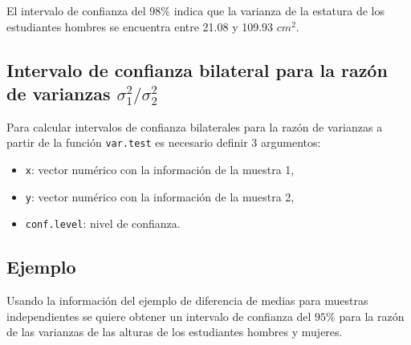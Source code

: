 \documentclass[
]{book}
\makeatletter
\newenvironment{Shaded}{\begin{snugshade}}{\end{snugshade}}
\newcommand{\AttributeTok}[1]{\textcolor[rgb]{0.77,0.63,0.00}{#1}}
\newcommand{\FloatTok}[1]{\textcolor[rgb]{0.00,0.00,0.81}{#1}}
\newcommand{\FunctionTok}[1]{\textcolor[rgb]{0.00,0.00,0.00}{#1}}
\newcommand{\NormalTok}[1]{#1}
\newcommand{\SpecialCharTok}[1]{\textcolor[rgb]{0.00,0.00,0.00}{#1}}
\providecommand{\tightlist}{%
  \setlength{\itemsep}{0pt}\setlength{\parskip}{0pt}}
\newenvironment{kframe}{%
\medskip{}
\setlength{\fboxsep}{.8em}
 \def\at@end@of@kframe{}%
 \ifinner\ifhmode%
  \def\at@end@of@kframe{\end{minipage}}%
  \begin{minipage}{\columnwidth}%
 \fi\fi%
 \def\FrameCommand##1{\hskip\@totalleftmargin \hskip-\fboxsep
 \colorbox{shadecolor}{##1}\hskip-\fboxsep
     \hskip-\linewidth \hskip-\@totalleftmargin \hskip\columnwidth}%
 \MakeFramed {\advance\hsize-\width
   \@totalleftmargin\z@ \linewidth\hsize
   \@setminipage}}%
 {\par\unskip\endMakeFramed%
 \at@end@of@kframe}
\renewenvironment{Shaded}{\begin{kframe}}{\end{kframe}}
\makeatother
\begin{document}
El intervalo de confianza del \(98\%\) indica que la varianza de la estatura de los estudiantes hombres se encuentra entre 21.08 y 109.93 \(cm^{2}\).

\hypertarget{intervalo-de-confianza-bilateral-para-la-razuxf3n-de-varianzas-sigma_12-sigma_22}{%
\subsection{\texorpdfstring{Intervalo de confianza bilateral para la razón de varianzas \(\sigma_1^2 / \sigma_2^2\)}{Intervalo de confianza bilateral para la razón de varianzas \textbackslash sigma\_1\^{}2 / \textbackslash sigma\_2\^{}2}}\label{intervalo-de-confianza-bilateral-para-la-razuxf3n-de-varianzas-sigma_12-sigma_22}}

Para calcular intervalos de confianza bilaterales para la razón de varianzas a partir de la función \texttt{var.test} es necesario definir 3 argumentos:

\begin{itemize}
\tightlist
\item
  \texttt{x}: vector numérico con la información de la muestra 1,
\item
  \texttt{y}: vector numérico con la información de la muestra 2,
\item
  \texttt{conf.level}: nivel de confianza.
\end{itemize}

\hypertarget{ejemplo-60}{%
\subsection*{Ejemplo}\label{ejemplo-60}}

Usando la información del ejemplo de diferencia de medias para muestras independientes se quiere obtener un intervalo de confianza del \(95\%\) para la razón de las varianzas de las alturas de los estudiantes hombres y mujeres.

\begin{Shaded}
\end{Shaded}
\end{document}
